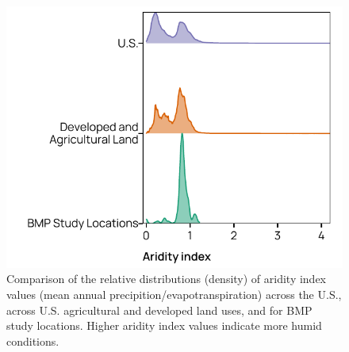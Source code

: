 \documentclass[utf8]{FrontiersinHarvard}
\begin{document}
\begin{figure}[p]
\includegraphics[width=0.5\linewidth,]{frontiers_submission_revision_01_files/figure-latex/fig8} \caption{Comparison of the relative distributions (density) of aridity index values (mean annual precipition/evapotranspiration) across the U.S., across U.S. agricultural and developed land uses, and for BMP study locations. Higher aridity index values indicate more humid conditions.}\label{fig:fig8}
\end{figure}
\end{document}

